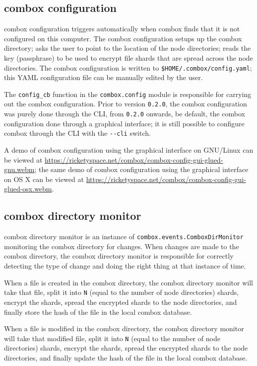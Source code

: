\subsection{combox configuration}\label{sec:4-combox-config}

combox configuration triggers automatically when combox finds that it
is not configured on this computer. The combox configuration setups up
the combox directory; asks the user to point to the location of the
node directories; reads the key (passphrase) to be used to encrypt
file shards that are spread across the node directories. The combox
configuration is written to
\verb+$HOME/.combox/config.yaml+; this YAML configuration file can be
manually edited by the user.

The \verb+config_cb+ function in the \verb+combox.config+ module is
responsible for carrying out the combox configuration. Prior to
version \verb+0.2.0+, the combox configuration was purely done through
the CLI, from \verb+0.2.0+ onwards, be default, the combox
configuration done through a graphical interface; it is still possible
to configure combox through the CLI with the \verb+--cli+ switch.

A demo of combox configuration using the graphical interface on
GNU/Linux can be viewed at
\url{https://ricketyspace.net/combox/combox-config-gui-glued-gnu.webm};
the same demo of combox configuration using the graphical interface on
OS X can be viewed at
\url{https://ricketyspace.net/combox/combox-config-gui-glued-osx.webm}.

\subsection{combox directory monitor}\label{sec:4-combox-cdirm}

combox directory monitor is an instance of
\verb+combox.events.ComboxDirMonitor+ monitoring the combox directory
for changes. When changes are made to the combox directory, the combox
directory monitor is responsible for correctly detecting the type of
change and doing the right thing at that instance of time.

When a file is created in the combox directory, the combox directory
monitor will take that file, split it into \verb+N+ (equal to the
number of node directories) shards, encrypt the shards, spread the
encrypted shards to the node directories, and finally store the hash
of the file in the local combox database.

When a file is modified in the combox directory, the combox directory
monitor will take that modified file, split it into \verb+N+ (equal to
the number of node directories) shards, encrypt the shards, spread the
encrypted shards to the node directories, and finally update the hash
of the file in the local combox database.

